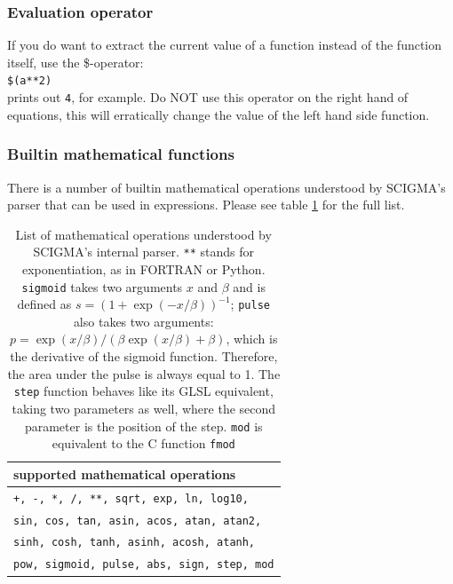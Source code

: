 \documentclass[10pt,a4paper,titlepage]{article}
\newcommand{\T}[1]{\texttt{#1}}
\begin{document}
\subsubsection*{Evaluation operator}
If you do want to extract the current value of a function instead of the function itself, use the \$-operator:\\
\T{\$(a**2)}\\
prints out \T{4}, for example. Do NOT use this operator on the right hand of equations, this will erratically change the value
of the left hand side function.
\subsubsection*{Builtin mathematical functions}
There is a number of builtin mathematical operations understood by SCIGMA's parser that can be used in expressions. Please see table \ref{supp} for the full list. %
\begin{table}
\centering
\begin{tabular}{l}
\textbf{supported mathematical operations}\\\hline
\T{+, -, *, /, **, sqrt, exp, ln, log10,}\\
\T{sin, cos, tan, asin, acos, atan, atan2,}\\
\T{sinh, cosh, tanh, asinh, acosh, atanh,}\\
\T{pow, sigmoid, pulse, abs, sign, step, mod} 
\end{tabular}
\caption{List of mathematical operations understood by SCIGMA's internal parser. \T{**} stands for exponentiation, as in FORTRAN or Python. \T{sigmoid} takes two arguments $x$ and $\beta$ and is defined as $s=(1+\exp(-x/\beta))^{-1}$; \T{pulse} also takes two arguments: $p=\exp(x/\beta)/(\beta\exp(x/\beta)+\beta)$, which is the derivative of the sigmoid function. Therefore, the area under the pulse is always equal to 1. The \T{step} function behaves like its GLSL equivalent, taking two parameters as well, where the second parameter is the position of the step. \T{mod} is equivalent to the C function \T{fmod}}
\label{supp}
\end{table}
\end{document}

